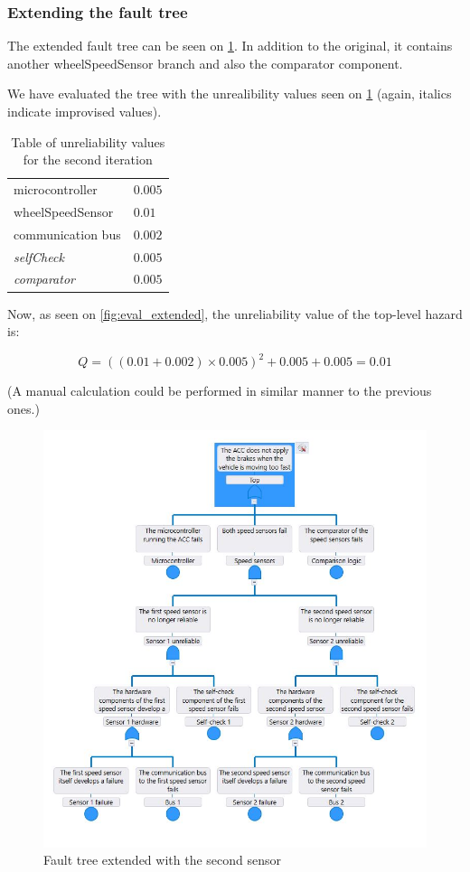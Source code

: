 \documentclass[a4paper]{article}
\begin{document}
\subsubsection{Extending the fault tree}

The extended fault tree can be seen on \cref{fig:fault_tree_extended}. In
addition to the original, it contains another \gls{wheelSpeedSensor} branch and
also the comparator component.

We have evaluated the tree with the unrealibility values seen on
\cref{tab:unreliability_extended} (again, italics indicate improvised values).

\begin{table}
	\centering
	\begin{tabular}{ll}
		\toprule
		microcontroller          & \(0.005\) \\
		\gls{wheelSpeedSensor}   & \(0.01\)  \\
		communication bus        & \(0.002\) \\
		\textit{\gls{selfCheck}} & \(0.005\) \\
		\textit{comparator}      & \(0.005\) \\
		\bottomrule
	\end{tabular}
	\caption{Table of unreliability values for the second iteration}%
	\label{tab:unreliability_extended}
\end{table}

Now, as seen on \cref{fig:eval_extended}, the unreliability value of the
top-level hazard is:

\[ Q = {\left((0.01 + 0.002) \times 0.005\right)}^2 + 0.005 + 0.005 = 0.01 \]

(A manual calculation could be performed in similar manner to the previous
ones.)

\begin{figure}
	\centering
	\includegraphics[width=.5\textwidth]{fault_tree_extended.jpg}
	\caption{Fault tree extended with the second sensor}%
	\label{fig:fault_tree_extended}
\end{figure}
\end{document}
